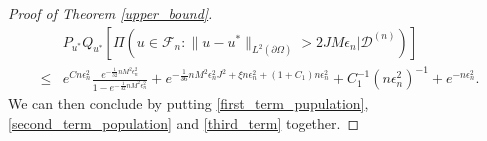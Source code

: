 \documentclass{article}
\newcommand{\F}{\mathcal{F}}
\newcommand{\D}{\mathcal{D}}
\theoremstyle{plain}
\theoremstyle{definition}
\theoremstyle{remark}
\begin{document}
\begin{proof}[Proof of Theorem \ref{upper_bound}]
\begin{equation} \label{second_term_population}
    \begin{aligned}
        & P_{u^*} Q_{u^*} \left[\Pi(u \in \F_n: \|u -u^*\|_{L^2(\partial \Omega)} > 2 J M \epsilon_n | \D^{(n)}) \right] \\
        \leq & e^{C n \epsilon_n^2} \frac{e^{-\frac{1}{32}n M^2 \epsilon_n^2}}{1 - e^{-\frac{1}{32}n M^2 \epsilon_n^2}} + e^{-\frac{1}{36} n M^2 \epsilon_{n}^2 J^2 + \xi n\epsilon_n^2 + (1+C_1) n \epsilon_n^2} + C_1^{-1} (n\epsilon_n^2)^{-1} + e^{-n\epsilon_n^2}. 
    \end{aligned}
\end{equation}
We can then conclude by putting \eqref{first_term_pupulation}, \eqref{second_term_population} and \eqref{third_term} together.
\end{proof}
\end{document}
